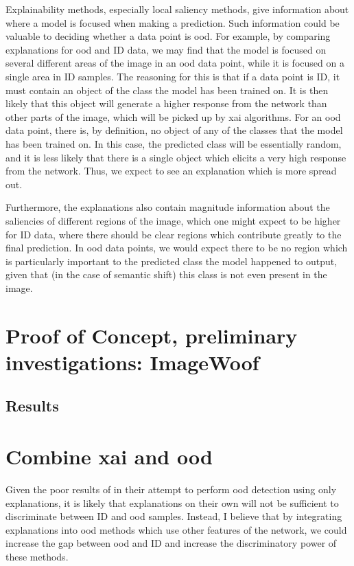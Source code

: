 \documentclass[UKenglish]{uiomasterthesis} %
\theoremstyle{definition}
\begin{document}
Explainability methods, especially local saliency methods, give information about where a model is focused when making a prediction. Such information could be valuable to deciding whether a data point is \ac{ood}. For example, by comparing explanations for \ac{ood} and ID data, we may find that the model is focused on several different areas of the image in an \ac{ood} data point, while it is focused on a single area in ID samples. The reasoning for this is that if a data point is ID, it must contain an object of the class the model has been trained on. It is then likely that this object will generate a higher response from the network than other parts of the image, which will be picked up by \ac{xai} algorithms. For an \ac{ood} data point, there is, by definition, no object of any of the classes that the model has been trained on. In this case, the predicted class will be essentially random, and it is less likely that there is a single object which elicits a very high response from the network. Thus, we expect to see an explanation which is more spread out.

Furthermore, the explanations also contain magnitude information about the saliencies of different regions of the image, which one might expect to be higher for ID data, where there should be clear regions which contribute greatly to the final prediction. In \ac{ood} data points, we would expect there to be no region which is particularly important to the predicted class the model happened to output, given that (in the case of semantic shift) this class is not even present in the image.

\section{Proof of Concept, preliminary investigations: ImageWoof}


\subsection{Results}



\section{Combine \ac{xai} and \ac{ood}}

Given the poor results of \cite{martinez} in their attempt to perform \ac{ood} detection using only explanations, it is likely that explanations on their own will not be sufficient to discriminate between ID and \ac{ood} samples. Instead, I believe that by integrating explanations into \ac{ood} methods which use other features of the network, we could increase the gap between \ac{ood} and ID and increase the discriminatory power of these methods.
\end{document}
